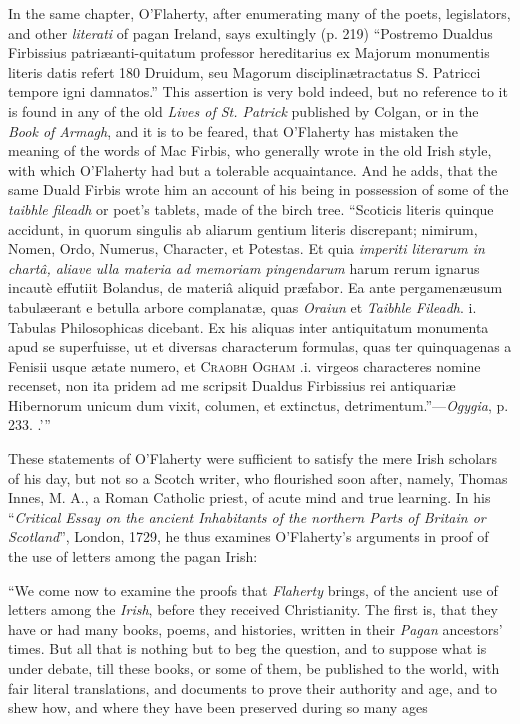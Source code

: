 \documentclass[11pt,oneside]{memoir}
\begin{document}
{    In the same chapter, O'Flaherty, after enumerating many of the poets, legislators, and other \textit{literati} of pagan Ireland, says exultingly (p. 219) ``Postremo Dualdus Firbissius patri\ae anti-quitatum professor hereditarius ex Majorum monumentis literis datis refert 180 Druidum, seu Magorum disciplin\ae tractatus S. Patricci tempore igni damnatos.''
    This assertion is very bold indeed, but no reference to it is found in any of the old \textit{Lives of St. Patrick} published by Colgan, or in the \textit{Book of Armagh}, and it is to be feared, that O'Flaherty has mistaken the meaning of the words of Mac Firbis, who generally wrote in the old Irish style, with which O'Flaherty had but a tolerable acquaintance.
    And he adds, that the same Duald Firbis wrote him an account of his being in possession of some of the \textit{taibhle fileadh} or poet's tablets, made of the birch tree.
    ``Scoticis literis quinque accidunt, in quorum singulis ab aliarum gentium literis discrepant; nimirum, Nomen, Ordo, Numerus, Character, et Potestas.
    Et quia \textit{imperiti literarum in chart\^a, aliave ulla materia ad memoriam pingendarum} harum rerum ignarus incaut\`e effutiit Bolandus, de materi\^a aliquid pr{\ae}fabor.
    Ea ante pergamen\ae usum tabul\ae erant e betulla arbore complanat\ae, quas \textit{Oraiun} et \textit{Taibhle Fileadh}. i. Tabulas Philosophicas dicebant.
    Ex his aliquas inter antiquitatum monumenta apud se superfuisse, ut et diversas characterum formulas, quas ter quinquagenas a Fenisii usque {\ae}tate numero, et \textsc{Craobh Ogham} .i. virgeos characteres nomine recenset, non ita pridem ad me scripsit Dualdus Firbissius rei antiquari{\ae} Hibernorum unicum dum vixit, columen, et extinctus, detrimentum.''---\textit{Ogygia}, p. 233.
}.'\hspace{0pt}''

These statements of O'Flaherty were sufficient to satisfy the mere Irish scholars of his day, but not so a Scotch writer, who flourished soon after, namely, Thomas Innes, M. A., a Roman Catholic priest, of acute mind and true learning.
In his ``\textit{Critical Essay on the ancient Inhabitants of the northern Parts of Britain or Scotland}'', London, 1729, he thus examines O'Flaherty's arguments in proof of the use of letters among the pagan Irish:

``We come now to examine the proofs that \textit{Flaherty} brings, of the ancient use of letters among the \textit{Irish}, before they received Christianity.
The first is, that they have or had many books, poems, and histories, written in their \textit{Pagan} ancestors' times.
But all that is nothing but to beg the question, and to suppose what is under debate, till these books, or some of them, be published to the world, with fair literal translations, and documents to prove their authority and age, and to shew how, and where they have been preserved during so many ages
\end{document}
